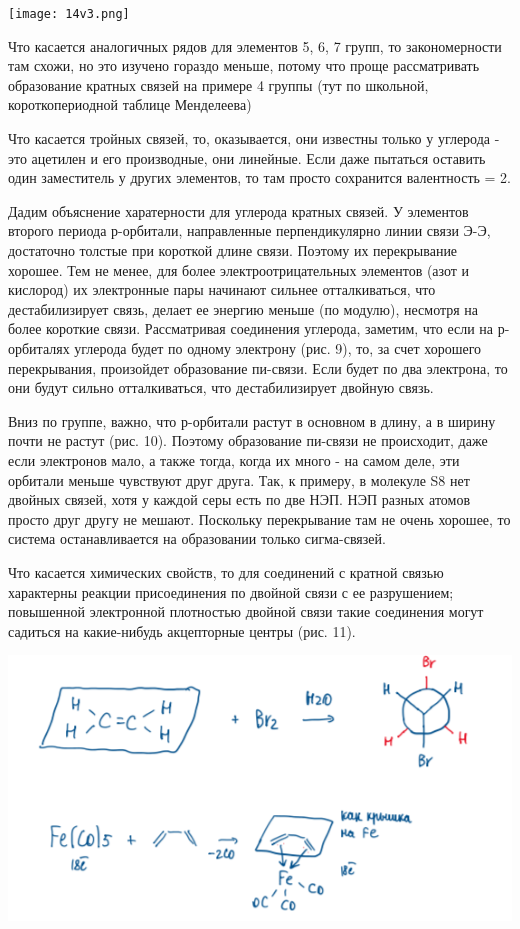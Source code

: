 \documentclass[14pt,a4paper]{scrartcl}
\begin{document}
\texttt{[image: 14v3.png]}

Что касается аналогичных рядов для элементов 5, 6, 7 групп, то закономерности там схожи, но это изучено гораздо меньше, потому что проще рассматривать образование кратных связей на
примере 4 группы (тут по школьной, короткопериодной таблице Менделеева)

Что касается тройных связей, то, оказывается, они известны только у углерода - это ацетилен и его производные, они линейные. Если даже пытаться оставить один заместитель у других
элементов, то там просто сохранится валентность = 2.

Дадим объяснение харатерности для углерода кратных связей. У элементов второго периода р-орбитали, направленные перпендикулярно линии связи Э-Э, достаточно толстые при короткой длине
связи. Поэтому их перекрывание хорошее. Тем не менее, для более электроотрицательных элементов (азот и кислород) их электронные пары начинают сильнее отталкиваться, что
дестабилизирует связь, делает ее энергию меньше (по модулю), несмотря на более короткие связи. Рассматривая соединения углерода, заметим, что если на р-орбиталях углерода будет по одному
электрону (рис. 9), то, за счет хорошего перекрывания, произойдет образование пи-связи. Если будет по два электрона, то они будут сильно отталкиваться, что дестабилизирует двойную связь.

Вниз по группе, важно, что р-орбитали растут в основном в длину, а в ширину почти не растут (рис. 10). Поэтому образование пи-связи не происходит, даже если электронов мало, а также тогда,
когда их много - на самом деле, эти орбитали меньше чувствуют друг друга. Так, к примеру, в молекуле S8 нет двойных связей, хотя у каждой серы есть по две НЭП. НЭП разных атомов просто
друг другу не мешают. Поскольку перекрывание там не очень хорошее, то система останавливается на образовании только сигма-связей.

Что касается химических свойств, то для соединений с кратной связью характерны реакции присоединения по двойной связи с ее разрушением; повышенной электронной плотностью двойной
связи такие соединения могут садиться на какие-нибудь акцепторные центры (рис. 11).

\includegraphics{14v4.png}
\end{document}
